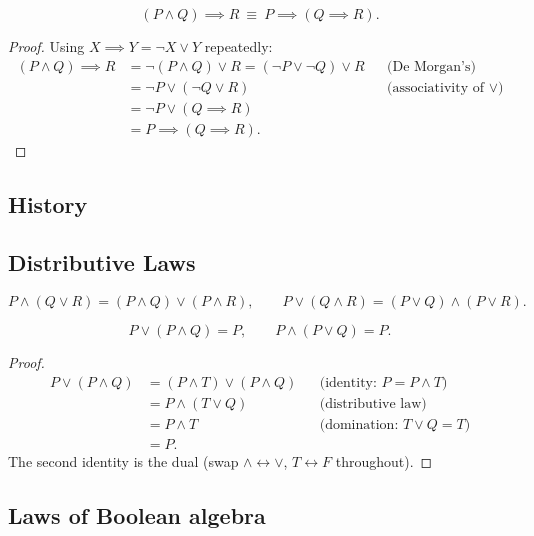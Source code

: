 \documentclass[11pt]{article}
\begin{document}
\bigskip
\begin{theorem}
\[
(P \wedge Q) \implies R \ \equiv \ P \implies (Q \implies R).
\]
\end{theorem}
\begin{proof}
Using $X\implies Y = \neg X \vee Y$ repeatedly:
\begin{align*}
(P\wedge Q)\implies R &= \neg(P\wedge Q)\vee R = (\neg P \vee \neg Q)\vee R && \text{(De Morgan's)}\\
&= \neg P \vee (\neg Q \vee R) && \text{(associativity of $\vee$)}\\
&= \neg P \vee (Q \implies R) \\
&= P \implies (Q \implies R).
\end{align*}
\end{proof}

\subsection{History}
\label{sec:4-13}

\subsection{Distributive Laws}
\label{sec:4-14}

\begin{theorem}
\[
P \wedge (Q\vee R) = (P\wedge Q)\vee(P\wedge R), \qquad P \vee (Q\wedge R) = (P\vee Q)\wedge(P\vee R).
\]
\end{theorem}

\bigskip
\begin{theorem}
\[
P \vee (P\wedge Q) = P, \qquad P \wedge (P\vee Q) = P.
\]
\end{theorem}
\begin{proof}
\begin{align*}
P \vee (P\wedge Q) &= (P\wedge T)\vee(P\wedge Q) && \text{(identity: $P = P\wedge T$)}\\
&= P \wedge (T \vee Q) && \text{(distributive law)}\\
&= P \wedge T && \text{(domination: $T\vee Q=T$)}\\
&= P.
\end{align*}
The second identity is the dual (swap $\wedge \leftrightarrow \vee$, $T \leftrightarrow F$ throughout).
\end{proof}

\subsection{Laws of Boolean algebra}
\label{sec:4-15}
\end{document}
